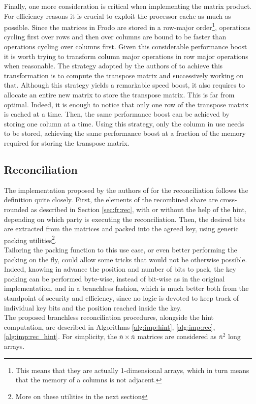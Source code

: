 Finally, one more consideration is critical when implementing the matrix product. For efficiency reasons it is crucial to exploit the processor cache as much as possible. Since the matrices in Frodo are stored in a row-major order\footnote{This means that they are actually 1-dimensional arrays, which in turn means that the memory of a columns is not adjacent.}, operations cycling first over rows and then over columns are bound to be faster than operations cycling over columns first. Given this considerable performance boost it is worth trying to transform column major operations in row major operations when reasonable. The strategy adopted by the authors of \cite{frodo} to achieve this transformation is to compute the transpose matrix and successively working on that. Although this strategy yields a remarkable speed boost, it also requires to allocate an entire new matrix to store the transpose matrix. This is far from optimal. Indeed, it is enough to notice that only one row of the transpose matrix is cached at a time. Then, the same performance boost can be achieved by storing one column at a time. Using this strategy, only the column in use needs to be stored, achieving the same performance boost at a fraction of the memory required for storing the transpose matrix.

\subsection{Reconciliation}\label{sec:imp:rec}
The implementation proposed by the authors of \cite{frodo} for the reconciliation follows the definition quite closely. First, the elements of the recombined share are cross-rounded as described in Section \ref{sec:fr:rec}, with or without the help of the hint, depending on which party is executing the reconciliation. Then, the desired bits are extracted from the matrices and packed into the agreed key, using generic packing utilities\footnote{More on these utilities in the next section}.\\
Tailoring the packing function to this use case, or even better performing the packing on the fly, could allow some tricks that would not be otherwise possible. Indeed, knowing in advance the position and number of bits to pack, the key packing can be performed byte-wise, instead of bit-wise as in the original implementation, and in a branchless fashion, which is much better both from the standpoint of security and efficiency, since no logic is devoted to keep track of individual key bits and the position reached inside the key.\\
The proposed branchless reconciliation procedures, alongside the hint computation, are described in Algorithms \ref{alg:imp:hint}, \ref{alg:imp:rec}, \ref{alg:imp:rec_hint}. For simplicity, the $\bar{n}\times\bar{n}$ matrices are considered as $\bar{n}^2$ long arrays.

